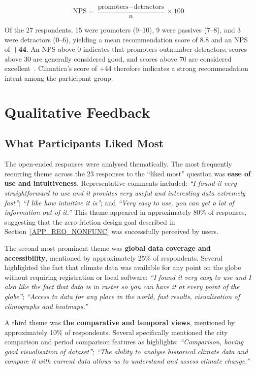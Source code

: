 \[
  \text{NPS} = \frac{\text{promoters} - \text{detractors}}{n} \times 100
\]

Of the 27 respondents, 15 were promoters (9--10), 9 were passives (7--8), and
3 were detractors (0--6), yielding a mean recommendation score of 8.8 and an
NPS of \textbf{+44}. An NPS above 0 indicates that promoters outnumber
detractors; scores above 30 are generally considered good, and scores above 70
are considered excellent~\cite{reichheld2003nps}. Climatica's score of +44
therefore indicates a strong recommendation intent among the participant group.

\section{Qualitative Feedback}\label{EVAL_QUAL}

\subsection{What Participants Liked Most}\label{EVAL_QUAL_LIKED}

The open-ended responses were analysed thematically. The most frequently
recurring theme across the 23 responses to the ``liked most'' question was
\textbf{ease of use and intuitiveness}. Representative comments included:
\emph{``I found it very straightforward to use and it provides very useful and
interesting data extremely fast''}; \emph{``I like how intuitive it is''}; and
\emph{``Very easy to use, you can get a lot of information out of it.''} This theme
appeared in approximately 80\% of responses, suggesting that the zero-friction
design goal described in Section~\ref{APP_REQ_NONFUNC} was successfully
perceived by users.

The second most prominent theme was \textbf{global data coverage and
accessibility}, mentioned by approximately 25\% of respondents. Several
highlighted the fact that climate data was available for any point on the
globe without requiring registration or local software:
\emph{``I found it very easy to use and I also like the fact that data is
in raster so you can have it at every point of the globe''};
\emph{``Access to data for any place in the world, fast results, visualisation
of climographs and heatmaps.''}

A third theme was \textbf{the comparative and temporal views}, mentioned by
approximately 10\% of respondents. Several specifically mentioned the city
comparison and period comparison features as highlights:
\emph{``Comparison, having good visualisation of dataset''};
\emph{``The ability to analyse historical climate data and compare it with current
data allows us to understand and assess climate change.''}

